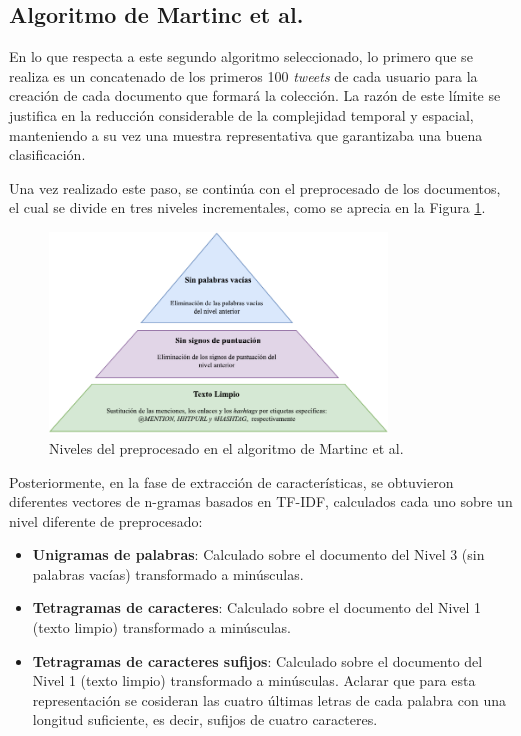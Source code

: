 {\subsection{Algoritmo de Martinc et al. \cite{martinc2019hot}}

En lo que respecta a este segundo algoritmo seleccionado, lo primero que se realiza es un concatenado de los primeros 100 \textit{tweets} de cada usuario para la creación de cada documento
que formará la colección. La razón de este límite se justifica en la reducción considerable de la complejidad temporal y espacial, manteniendo a su vez una muestra representativa que garantizaba
una buena clasificación.

\bigskip
Una vez realizado este paso, se continúa con el preprocesado de los documentos, el cual se divide en tres niveles incrementales, como se aprecia en la Figura \ref{fig:preprocesado_martinc}.

\bigskip
\begin{figure}[H]
	\centering
	\includegraphics[width=0.8\textwidth]{diagramas/pyramid-martinc.pdf}
	\caption{Niveles del preprocesado en el algoritmo de Martinc et al. \cite{martinc2019hot}}
	\label{fig:preprocesado_martinc}
\end{figure}

Posteriormente, en la fase de extracción de características, se obtuvieron diferentes vectores de n-gramas basados en TF-IDF, calculados cada uno sobre un nivel diferente de preprocesado:

\bigskip
\begin{itemize}
	\item \textbf{Unigramas de palabras}: Calculado sobre el documento del Nivel 3 (sin palabras vacías) transformado a minúsculas.
	\item \textbf{Tetragramas de caracteres}: Calculado sobre el documento del Nivel 1 (texto limpio) transformado a minúsculas.
	\item \textbf{Tetragramas de caracteres sufijos}: Calculado sobre el documento del Nivel 1 (texto limpio) transformado a minúsculas. Aclarar que para esta representación
	      se cosideran las cuatro últimas letras de cada palabra con una longitud suficiente, es decir, sufijos de cuatro caracteres.
\end{itemize}

}
